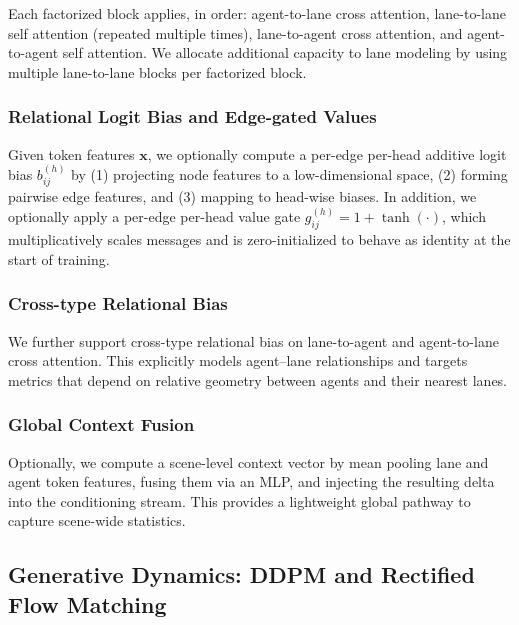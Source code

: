 \documentclass{article}
\theoremstyle{plain}
\theoremstyle{definition}
\theoremstyle{remark}
\begin{document}
Each factorized block applies, in order: agent-to-lane cross attention, lane-to-lane self attention (repeated multiple times),
lane-to-agent cross attention, and agent-to-agent self attention. We allocate additional capacity to lane modeling by using multiple
lane-to-lane blocks per factorized block.

\subsubsection{Relational Logit Bias and Edge-gated Values}

Given token features \(\mathbf{x}\), we optionally compute a per-edge per-head additive logit bias \(b_{ij}^{(h)}\) by
(1) projecting node features to a low-dimensional space, (2) forming pairwise edge features, and (3) mapping to head-wise biases.
In addition, we optionally apply a per-edge per-head value gate \(g_{ij}^{(h)} = 1+\tanh(\cdot)\), which multiplicatively scales
messages and is zero-initialized to behave as identity at the start of training.

\subsubsection{Cross-type Relational Bias}

We further support cross-type relational bias on lane-to-agent and agent-to-lane cross attention. This explicitly models agent--lane
relationships and targets metrics that depend on relative geometry between agents and their nearest lanes.

\subsubsection{Global Context Fusion}

Optionally, we compute a scene-level context vector by mean pooling lane and agent token features, fusing them via an MLP, and injecting
the resulting delta into the conditioning stream. This provides a lightweight global pathway to capture scene-wide statistics.


\subsection{Generative Dynamics: DDPM and Rectified Flow Matching}
\label{app:diffusion_flow}
\end{document}
